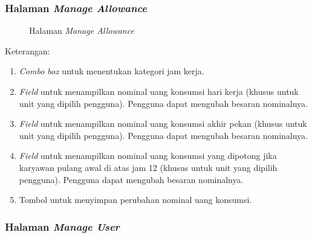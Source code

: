 
\subsubsection{Halaman \textit{Manage Allowance}}
\label{sec:page4}

\begin{figure}[H]
	\centering
	\caption{Halaman \textit{Manage Allowance}}
	\label{fig:page4}
\end{figure}	

Keterangan:
\begin{enumerate}
	\item \textit{Combo box} untuk menentukan kategori jam kerja.
	\item \textit{Field} untuk menampilkan nominal uang konsumsi hari kerja (khusus untuk unit yang dipilih pengguna). Pengguna dapat mengubah besaran nominalnya.
	\item \textit{Field} untuk menampilkan nominal uang konsumsi akhir pekan (khusus untuk unit yang dipilih pengguna). Pengguna dapat mengubah besaran nominalnya.
	\item \textit{Field} untuk menampilkan nominal uang konsumsi yang dipotong jika karyawan pulang awal di atas jam 12 (khusus untuk unit yang dipilih pengguna). Pengguna dapat mengubah besaran nominalnya.
	\item Tombol untuk menyimpan perubahan nominal uang konsumsi.
\end{enumerate}


\subsubsection{Halaman \textit{Manage User}}
\label{sec:page5}

